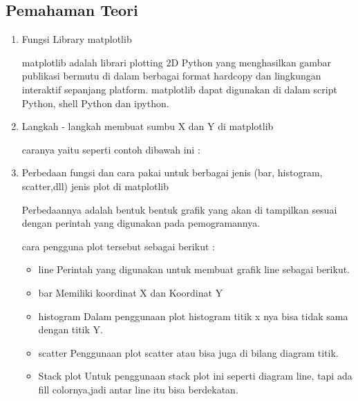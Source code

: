 \subsection{Pemahaman Teori}
\begin{enumerate}
\item Fungsi Library matplotlib

matplotlib adalah librari plotting 2D Python yang menghasilkan gambar publikasi bermutu di dalam berbagai format hardcopy dan lingkungan interaktif sepanjang platform. matplotlib dapat digunakan di dalam script Python, shell Python dan ipython.

\item Langkah - langkah membuat sumbu X dan Y di matplotlib

caranya yaitu seperti contoh dibawah ini :


\item Perbedaan fungsi dan cara pakai untuk berbagai jenis (bar, histogram, scatter,dll) jenis plot di matplotlib

Perbedaannya adalah bentuk bentuk grafik yang akan di tampilkan sesuai dengan perintah yang digunakan pada pemogramannya.

cara pengguna plot tersebut sebagai berikut :

\begin{itemize}
    \item line
    Perintah yang digunakan untuk membuat grafik line sebagai berikut.
    
	
    \item bar
    Memiliki koordinat X dan Koordinat Y
	
    
    \item histogram
    Dalam penggunaan plot histogram titik x nya bisa tidak sama dengan titik Y.
    
   
    \item scatter
   Penggunaan plot scatter atau bisa juga di bilang diagram titik.
   
    
    \item Stack plot
    Untuk penggunaan stack plot ini seperti diagram line, tapi ada fill colornya,jadi antar line itu bisa berdekatan.
	
    

\end{itemize}
\end{enumerate}
